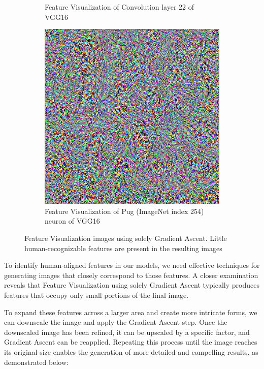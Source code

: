 \begin{figure}
\begin{subfigure}[t]{0.28\textwidth}
        \caption{Feature Visualization of Convolution layer 22 of VGG16}
    \end{subfigure}
    \hfill
    \begin{subfigure}[t]{0.28\textwidth}
        \captionsetup{justification=centering}
        \centering
        \includegraphics[width=.7\linewidth]{figuras/feat_vis/random_image_dream_class_254.png}
        \caption{Feature Visualization of Pug (ImageNet index 254) neuron of VGG16}
    \end{subfigure}

    \caption{
        Feature Visualization images using solely Gradient Ascent. 
    Little human-recognizable features are present in the resulting images
    }
\end{figure}

To identify human-aligned features in our models, we need effective techniques for generating images that closely correspond to those features. 
A closer examination reveals that Feature Visualization using solely Gradient Ascent typically produces features that occupy only small portions of the final image.

To expand these features across a larger area and create more intricate forms, we can downscale the image and apply the Gradient Ascent step. 
Once the downscaled image has been refined, it can be upscaled by a specific factor, and Gradient Ascent can be reapplied. 
\newpage
\noindent
Repeating this process until the image reaches its original size enables the generation of more detailed and compelling results, as demonstrated below:

